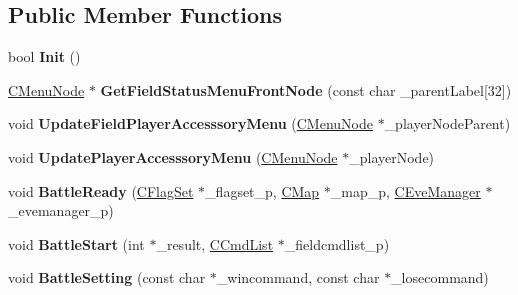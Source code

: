 \subsection*{Public Member Functions}
\begin{DoxyCompactItemize}
\item 
bool {\bfseries Init} ()\hypertarget{class_c_battle_ad4288e53bf58336701344736e71a65f9}{}\label{class_c_battle_ad4288e53bf58336701344736e71a65f9}

\item 
\hyperlink{class_c_menu_node}{C\+Menu\+Node} $\ast$ {\bfseries Get\+Field\+Status\+Menu\+Front\+Node} (const char \+\_\+parent\+Label\mbox{[}32\mbox{]})\hypertarget{class_c_battle_ad6799bcab4e9db10d5c4d81aab5c4ce5}{}\label{class_c_battle_ad6799bcab4e9db10d5c4d81aab5c4ce5}

\item 
void {\bfseries Update\+Field\+Player\+Accesssory\+Menu} (\hyperlink{class_c_menu_node}{C\+Menu\+Node} $\ast$\+\_\+player\+Node\+Parent)\hypertarget{class_c_battle_ad73a837f6724042dabec35d85ede91e4}{}\label{class_c_battle_ad73a837f6724042dabec35d85ede91e4}

\item 
void {\bfseries Update\+Player\+Accesssory\+Menu} (\hyperlink{class_c_menu_node}{C\+Menu\+Node} $\ast$\+\_\+player\+Node)\hypertarget{class_c_battle_ae51c1961332588459c81f9b8383c4357}{}\label{class_c_battle_ae51c1961332588459c81f9b8383c4357}

\item 
void {\bfseries Battle\+Ready} (\hyperlink{class_c_flag_set}{C\+Flag\+Set} $\ast$\+\_\+flagset\+\_\+p, \hyperlink{class_c_map}{C\+Map} $\ast$\+\_\+map\+\_\+p, \hyperlink{class_c_eve_manager}{C\+Eve\+Manager} $\ast$\+\_\+evemanager\+\_\+p)\hypertarget{class_c_battle_aa7c067df082cdf0790580bdba32e0363}{}\label{class_c_battle_aa7c067df082cdf0790580bdba32e0363}

\item 
void {\bfseries Battle\+Start} (int $\ast$\+\_\+result, \hyperlink{class_c_cmd_list}{C\+Cmd\+List} $\ast$\+\_\+fieldcmdlist\+\_\+p)\hypertarget{class_c_battle_ad264d63f91b14627d7a207e71478a404}{}\label{class_c_battle_ad264d63f91b14627d7a207e71478a404}

\item 
void {\bfseries Battle\+Setting} (const char $\ast$\+\_\+wincommand, const char $\ast$\+\_\+losecommand)\hypertarget{class_c_battle_a277f05cdd55dfbf28e21cbcdd7d4e325}{}\label{class_c_battle_a277f05cdd55dfbf28e21cbcdd7d4e325}


\end{DoxyCompactItemize}
